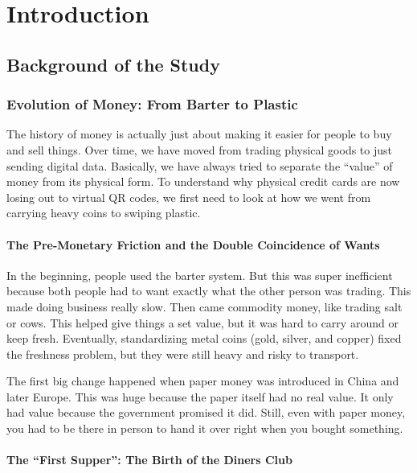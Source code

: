 \chapter{Introduction}

\section{Background of the Study}

\subsection{Evolution of Money: From Barter to Plastic}

The history of money is actually just about making it easier for people to buy and sell things. Over time, we have moved from trading physical goods to just sending digital data. Basically, we have always tried to separate the ``value'' of money from its physical form. To understand why physical credit cards are now losing out to virtual QR codes, we first need to look at how we went from carrying heavy coins to swiping plastic.

\subsubsection{The Pre-Monetary Friction and the Double Coincidence of Wants}

In the beginning, people used the barter system. But this was super inefficient because both people had to want exactly what the other person was trading. This made doing business really slow. Then came commodity money, like trading salt or cows. This helped give things a set value, but it was hard to carry around or keep fresh. Eventually, standardizing metal coins (gold, silver, and copper) fixed the freshness problem, but they were still heavy and risky to transport.

The first big change happened when paper money was introduced in China and later Europe. This was huge because the paper itself had no real value. It only had value because the government promised it did. Still, even with paper money, you had to be there in person to hand it over right when you bought something.

\subsubsection{The ``First Supper'': The Birth of the Diners Club}

